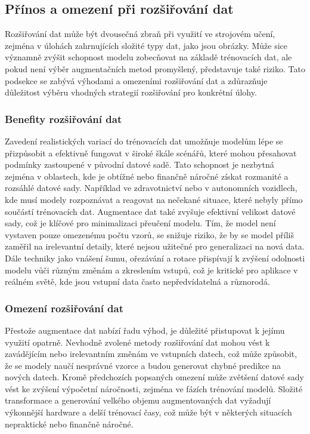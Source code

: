\documentclass[male,czech,api_ing]{thesis}
\begin{document}
\subsection{Přínos a omezení při rozšiřování dat}
Rozšiřování dat může být dvousečná zbraň při využití ve strojovém učení, zejména v úlohách zahrnujících složité typy dat, jako jsou obrázky. Může sice významně zvýšit schopnost modelu zobecňovat na základě trénovacích dat, ale pokud není výběr augmentačních metod promyšlený, představuje také riziko. Tato podsekce se zabývá výhodami a omezeními rozšiřování dat a zdůrazňuje důležitost výběru vhodných strategií rozšiřování pro konkrétní úlohy.

\subsubsection{Benefity rozšiřování dat}
Zavedení realistických variací do trénovacích dat umožňuje modelům lépe se přizpůsobit a efektivně fungovat v široké škále scénářů, které mohou přesahovat podmínky zastoupené v původní datové sadě. Tato schopnost je nezbytná zejména v oblastech, kde je obtížné nebo finančně náročné získat rozmanité a rozsáhlé datové sady. Například ve zdravotnictví nebo v autonomních vozidlech, kde musí modely rozpoznávat a reagovat na nečekané situace, které nebyly přímo součástí trénovacích dat. Augmentace dat také zvyšuje efektivní velikost datové sady, což je klíčové pro minimalizaci přeučení modelu. Tím, že model není vystaven pouze omezenému počtu vzorů, se snižuje riziko, že by se model příliš zaměřil na irelevantní detaily, které nejsou užitečné pro generalizaci na nová data. Dále techniky jako vnášení šumu, ořezávání a rotace přispívají k zvýšení odolnosti modelu vůči různým změnám a zkreslením vstupů, což je kritické pro aplikace v reálném světě, kde jsou vstupní data často nepředvídatelná a různorodá. \cite{AugmentationBasics, AugmentationSurvey}

\subsubsection{Omezení rozšiřování dat}
Přestože augmentace dat nabízí řadu výhod, je důležité přistupovat k jejímu využití opatrně. Nevhodně zvolené metody rozšiřování dat mohou vést k zavádějícím nebo irelevantním změnám ve vstupních datech, což může způsobit, že se modely naučí nesprávné vzorce a budou generovat chybné predikce na nových datech. Kromě předchozích popsaných omezení může zvětšení datové sady vést ke zvýšení výpočetní náročnosti, zejména ve fázích trénování modelů. Složité transformace a generování velkého objemu augmentovaných dat vyžadují výkonnější hardware a delší trénovací časy, což může být v některých situacích nepraktické nebo finančně náročné.
\end{document}
